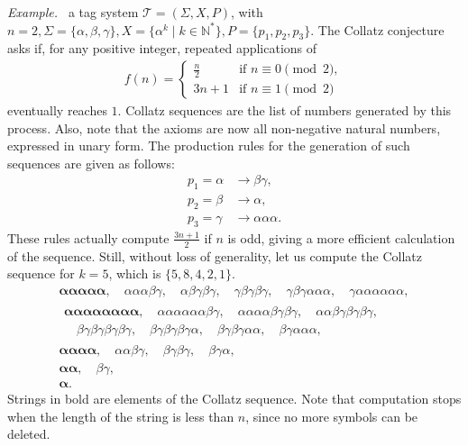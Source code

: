 \documentclass[12pt]{article}
\begin{document}
\emph{Example.~\cite[Theorem 2.1]{DeMol:article:2008:nov}} a tag system $\mathcal{T} = (\Sigma, X, P)$, with $n = 2, \Sigma = \{\alpha, \beta, \gamma\}, X = \{\alpha^{k} \mid k \in \mathbb{N}^{*}\}, P = \{p_{1}, p_{2}, p_{3}\}$. The Collatz conjecture asks if, for any positive integer, repeated applications of
\begin{align}
    f(n) = 
    \begin{cases}
        \frac{n}{2} & \text{if } n \equiv 0 \pmod{2}, \\
        3n + 1      & \text{if } n \equiv 1 \pmod{2}
    \end{cases}
\end{align}
eventually reaches $1$. Collatz sequences are the list of numbers generated by this process. Also, note that the axioms are now all non-negative natural numbers, expressed in unary form. The production rules for the generation of such sequences are given as follows:
\begin{align}
    p_{1} = \alpha &\rightarrow \beta\gamma,        \\
    p_{2} = \beta  &\rightarrow \alpha,             \\
    p_{3} = \gamma &\rightarrow \alpha\alpha\alpha.
\end{align}
These rules actually compute $\frac{3n + 1}{2}$ if $n$ is odd, giving a more efficient calculation of the sequence. Still, without loss of generality, let us compute the Collatz sequence for $k = 5$, which is $\{5, 8, 4, 2, 1\}$.
\begin{align}
    \boldsymbol{\alpha\alpha\alpha\alpha\alpha}, 
        \quad \alpha\alpha\alpha\beta\gamma,
        \quad \alpha\beta\gamma\beta\gamma,
        \quad \gamma\beta\gamma\beta\gamma,
        \quad \gamma\beta\gamma\alpha\alpha\alpha,
        \quad \gamma\alpha\alpha\alpha\alpha\alpha\alpha, \\
    \begin{split}
        \boldsymbol{\alpha\alpha\alpha\alpha\alpha\alpha\alpha\alpha}, 
            \quad \alpha\alpha\alpha\alpha\alpha\alpha\beta\gamma, 
            \quad \alpha\alpha\alpha\alpha\beta\gamma\beta\gamma, 
            \quad \alpha\alpha\beta\gamma\beta\gamma\beta\gamma, \\ 
            \quad \beta\gamma\beta\gamma\beta\gamma\beta\gamma, 
            \quad \beta\gamma\beta\gamma\beta\gamma\alpha, 
            \quad \beta\gamma\beta\gamma\alpha\alpha, 
            \quad \beta\gamma\alpha\alpha\alpha, &
    \end{split} \\
    \boldsymbol{\alpha\alpha\alpha\alpha}, 
        \quad \alpha\alpha\beta\gamma,
        \quad \beta\gamma\beta\gamma,
        \quad \beta\gamma\alpha, \\
    \boldsymbol{\alpha\alpha},
        \quad \beta\gamma, \\
    \boldsymbol{\alpha}.
\end{align}
Strings in bold are elements of the Collatz sequence. Note that computation stops when the length of the string is less than $n$, since no more symbols can be deleted.
\end{document}
